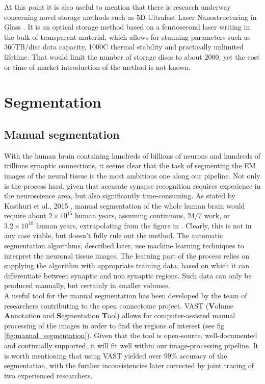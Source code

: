 \documentclass[a4paper, 11pt]{article}
\numberwithin{equation}{section}
\begin{document}
		\noindent At this point it is also useful to mention that there is research underway concerning novel storage methods such as 5D Ultrafast Laser Nanostructuring in Glass \cite{zhang20135d}. It is an optical storage method based on a femtosecond laser writing in the bulk of transparent material, which allows for stunning parameters such as 360TB/disc data capacity, 1000\degree C thermal stability and practically unlimited lifetime. That would limit the number of storage discs to about 2000, yet the cost or time of market introduction of the method is not known.
		
		\section{Segmentation}
		\label{segmentation}
		\subsection{Manual segmentation}
		With the human brain containing hundreds of billions of neurons and hundreds of trillions synaptic connections, it seems clear that the task of segmenting the EM images of the neural tissue is the most ambitious one along our pipeline. Not only is the process hard, given that accurate synapse recognition requires experience in the neuroscience area, but also significantly time-consuming. As stated by Kasthuri et al., 2015 \cite{kasthuri2015saturated}, manual segmentation of the whole human brain would require about $ 2 \times 10^{15}$ human years, assuming continuous, 24/7 work, or $3.2 \times 10^{10}$ human years, extrapolating from the figure in \cite{mishchenko2009automation}. Clearly, this is not in any case viable, but doesn't fully rule out the method. The automatic segmentation algorithms, described later, use machine learning techniques to interpret the neuronal tissue images. The learning part of the process relies on supplying the algorithm with appropriate training data, based on which it can differentiate between synaptic and non synaptic regions. Such data can only be produced manually, but certainly in smaller volumes. \\
		A useful tool for the manual segmentation has been developed by the team of researchers contributing to the open connectome project. VAST (\textbf{V}olume \textbf{A}nnotation and \textbf{S}egmentation \textbf{T}ool) allows for computer-assisted manual processing of the images in order to find the regions of interest (see fig \ref{fig:manual_segmentation}). Given that the tool is open-source, well-documented and continually supported, it will fit well within our image-processing pipeline. It is worth mentioning that using VAST yielded over 99\% accuracy of the segmentation, with the further inconsistencies later corrected by joint tracing of two experienced researchers.
		
\end{document}
